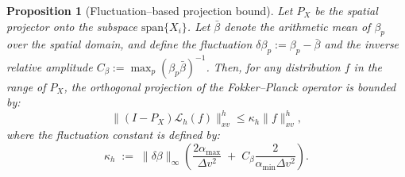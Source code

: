 \documentclass[]{article}
\numberwithin{equation}{section}
\newtheorem{proposition}[theorem]{Proposition}
\begin{document}
\begin{proposition}[Fluctuation--based projection bound]
\label{prop:fluctuation_bound}
Let $P_X$ be the spatial projector onto the subspace $\mathrm{span}\{X_i\}$. Let $\bar{\beta}$ denote the arithmetic mean of $\beta_p$ over the spatial domain, and define the fluctuation $\delta \beta_p := \beta_p - \bar{\beta}$ and the inverse relative amplitude $C_\beta := \max_p (\beta_p \bar{\beta})^{-1}$.
Then, for any distribution $f$ in the range of $P_X$, the orthogonal projection of the Fokker--Planck operator is bounded by:
\begin{equation}
  \|(I-P_X)\mathcal L_{h}(f)\|_{xv}^h \le \kappa_h \|f\|_{xv}^h,
\end{equation}
where the fluctuation constant is defined by:
\begin{equation}\label{eq:kappa_h_def}
  \kappa_h \;:=\; \|\delta \beta\|_\infty \left( \frac{2\alpha_{\max}}{\Delta v^2} \;+\; C_\beta \frac{2}{\alpha_{\min}\Delta v^2} \right).
\end{equation}
\end{proposition}
\end{document}
